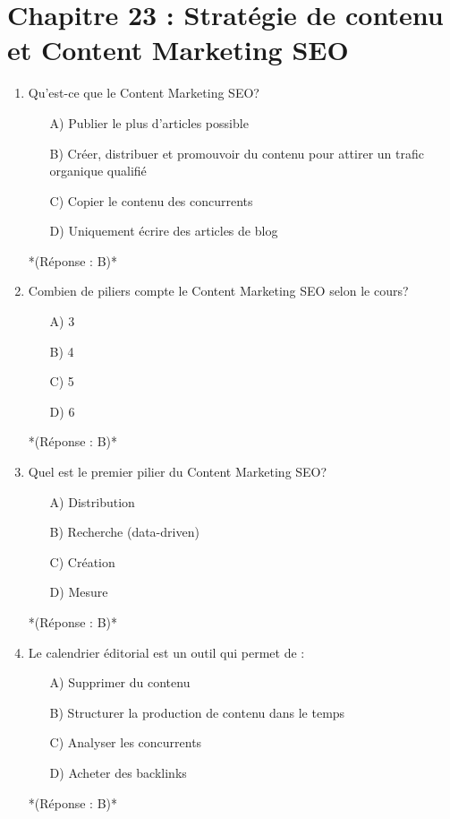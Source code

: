 \documentclass[12pt,a4paper,twoside]{report}
\begin{document}
\section*{Chapitre 23 : Stratégie de contenu et Content Marketing SEO}

\begin{enumerate}
\item Qu'est-ce que le Content Marketing SEO?
\begin{itemize}
\item[A)] Publier le plus d'articles possible
\item[B)] Créer, distribuer et promouvoir du contenu pour attirer un trafic organique qualifié
\item[C)] Copier le contenu des concurrents
\item[D)] Uniquement écrire des articles de blog
\end{itemize}
*(Réponse : B)*

\item Combien de piliers compte le Content Marketing SEO selon le cours?
\begin{itemize}
\item[A)] 3
\item[B)] 4
\item[C)] 5
\item[D)] 6
\end{itemize}
*(Réponse : B)*

\item Quel est le premier pilier du Content Marketing SEO?
\begin{itemize}
\item[A)] Distribution
\item[B)] Recherche (data-driven)
\item[C)] Création
\item[D)] Mesure
\end{itemize}
*(Réponse : B)*

\item Le calendrier éditorial est un outil qui permet de :
\begin{itemize}
\item[A)] Supprimer du contenu
\item[B)] Structurer la production de contenu dans le temps
\item[C)] Analyser les concurrents
\item[D)] Acheter des backlinks
\end{itemize}
*(Réponse : B)*


\end{enumerate}
\end{document}
